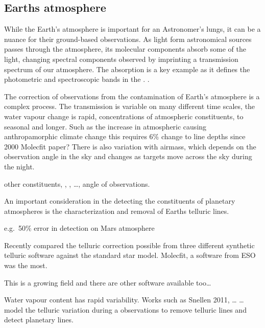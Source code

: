 \subsection{Earths atmosphere}
While the Earth's atmosphere is important for an Astronomer's lungs, it can be a nuance for their ground-based observations. As light form astronomical sources passes through the atmosphere, its molecular components absorb some of the light, changing spectral components observed by imprinting a transmission spectrum of our atmosphere. The  absorption is a key example as it defines the photometric and spectroscopic bands in the \nir{}. .

The correction of observations from the contamination of Earth's atmosphere is a complex process. The transmission is variable on many different time scales, the water vapour change is rapid, concentrations of atmospheric constituents, to seasonal and longer. Such as the increase in atmospheric  causing anthropamorphic climate change this requires 6\% change to  line depths since 2000 Molecfit paper? There is also variation with airmass, which depends on the observation angle in the sky and changes as targets move across the sky during the night.

other constituents, , ,  \ldots{}, angle of observations.

An important consideration in the detecting the constituents of planetary atmospheres is the characterization and removal of Earths telluric lines.

e.g.\ 50\% error in  detection on Mars atmosphere


Recently \citet{ulmer-moll_telluric_2018} compared the telluric correction possible from three different synthetic telluric software against the standard star model. Molecfit, a software from ESO was the most.

This is a growing field and there are other software available too\ldots{}


Water vapour content has rapid variability. Works such as Snellen 2011, \ldots{} \ldots{}  model the telluric variation during a observations to remove telluric lines and detect planetary lines.



